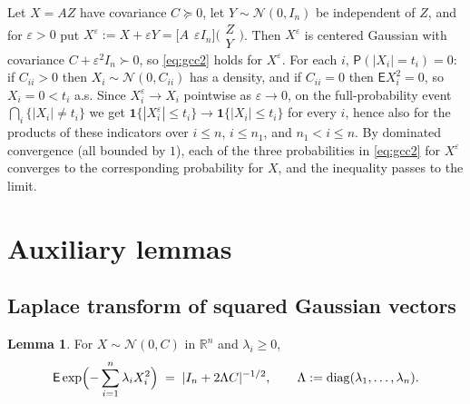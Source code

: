\documentclass[12pt,a4paper]{article}
\makeatletter
\theoremstyle{definition}
\newtheorem{lemma}[theorem]{Lemma}
\renewenvironment{proof}[1][\proofname]{\par
  \pushQED{\qed}%
  \normalfont \topsep6\p@\@plus6\p@\relax
  \trivlist
  \item[\hskip\labelsep\bfseries #1\@addpunct{.}]\ignorespaces
}{%
  \popQED\endtrivlist\@endpefalse
}
\newcommand{\R}{\mathbb{R}}
\newcommand{\PP}{\mathsf{P}}
\newcommand{\EE}{\mathsf{E}}
\newcommand{\diag}{\operatorname{diag}}
\newcommand{\caln}{\mathcal{N}}
\makeatother
\begin{document}
\begin{proof}
  Let $X=AZ$ have covariance $C\succcurlyeq 0$, let
  $Y\sim\caln(0,I_n)$ be independent of $Z$, and for $\varepsilon>0$
  put $X^\varepsilon:=X+\varepsilon Y=\bigl[A\ \ \varepsilon I_n\bigr]
  \bigl(\begin{smallmatrix}Z\\ Y\end{smallmatrix}\bigr)$.  Then $X^\varepsilon$ is centered Gaussian with
  covariance $C+\varepsilon^2I_n\succ 0$, so \eqref{eq:gcc2} holds for
  $X^\varepsilon$.  For each $i$, $\PP(|X_i|=t_i)=0$: if $C_{ii}>0$ then
  $X_i\sim\caln(0,C_{ii})$ has a density, and if $C_{ii}=0$ then
  $\EE X_i^2=0$, so $X_i=0<t_i$ a.s.  Since $X^\varepsilon_i\to X_i$
  pointwise as $\varepsilon\to 0$, on the full-probability event
  $\bigcap_i\{|X_i|\neq t_i\}$ we get
  $\mathbf 1\{|X^\varepsilon_i|\leqslant t_i\}\to
  \mathbf 1\{|X_i|\leqslant t_i\}$ for every $i$, hence also for the
  products of these indicators over $i\leqslant n$, $i\leqslant n_1$,
  and $n_1<i\leqslant n$.  By dominated convergence (all bounded by
  $1$), each of the three probabilities in \eqref{eq:gcc2} for
  $X^\varepsilon$ converges to the corresponding probability for $X$,
  and the inequality passes to the limit.
\end{proof}


\section{Auxiliary lemmas}\label{sec:lemmas}

\subsection{Laplace transform of squared Gaussian vectors}

\begin{lemma}\label{lem:Lap}
  For $X\sim\caln(0,C)$ in $\R^n$ and $\lambda_i\geqslant 0$,
  \[
    \EE\exp\Bigl(-\sum_{i=1}^n\lambda_iX_i^2\Bigr)
    \;=\;|I_n+2\Lambda C|^{-1/2},
    \qquad\Lambda:=\diag(\lambda_1,\ldots,\lambda_n).
  \]
\end{lemma}
\end{document}
